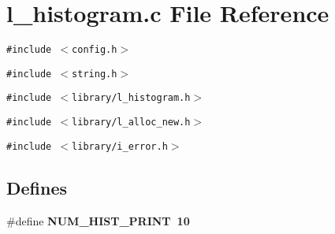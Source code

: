 \section{l\_\-histogram.c File Reference}
\label{l__histogram_8c}
{\tt \#include $<$config.h$>$}\par
{\tt \#include $<$string.h$>$}\par
{\tt \#include $<$library/l\_\-histogram.h$>$}\par
{\tt \#include $<$library/l\_\-alloc\_\-new.h$>$}\par
{\tt \#include $<$library/i\_\-error.h$>$}\par
\subsection*{Defines}
\begin{CompactItemize}
\item 
\#define \bf{NUM\_\-HIST\_\-PRINT}~10
\end{CompactItemize}

